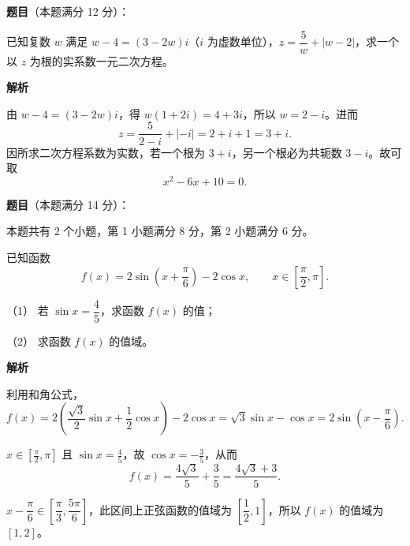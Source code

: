 \begin{answer}

\textbf{题目}（本题满分 12 分）：

已知复数 $w$ 满足 $w-4=(3-2w)i$（$i$ 为虚数单位），$z=\dfrac5w+|w-2|$，求一个以 $z$ 为根的实系数一元二次方程。

\textbf{解析}

由 $w-4=(3-2w)i$，得 $w(1+2i)=4+3i$，所以 $w=2-i$。进而
\nopagebreak[4]
\[
z=\frac5{2-i}+|-i|=2+i+1=3+i.
\]
因所求二次方程系数为实数，若一个根为 $3+i$，另一个根必为共轭数 $3-i$。故可取
\nopagebreak[4]
\[
x^2-6x+10=0.
\]


\end{answer}
\begin{answer}

\textbf{题目}（本题满分 14 分）：

本题共有 2 个小题，第 1 小题满分 8 分，第 2 小题满分 6 分。

已知函数
\nopagebreak[4]
\[
f(x)=2\sin\left(x+\frac\pi6\right)-2\cos x,\qquad x\in\left[\frac\pi2,\pi\right].
\]

（1） 若 $\sin x=\dfrac45$，求函数 $f(x)$ 的值；

（2） 求函数 $f(x)$ 的值域。

\textbf{解析}

利用和角公式，
\nopagebreak[4]
\[
f(x)=2\left(\frac{\sqrt3}{2}\sin x+\frac12\cos x\right)-2\cos x
=\sqrt3\sin x-\cos x
=2\sin\left(x-\frac\pi6\right).
\]


$x\in[\frac\pi2,\pi]$ 且 $\sin x=\frac45$，故 $\cos x=-\frac35$，从而
\nopagebreak[4]
\[
f(x)=\frac{4\sqrt3}{5}+\frac35=\frac{4\sqrt3+3}{5}.
\]


$x-\dfrac\pi6\in[\dfrac\pi3,\dfrac{5\pi}6]$，此区间上正弦函数的值域为 $[\dfrac12,1]$，所以 $f(x)$ 的值域为 $[1,2]$。



\end{answer}
